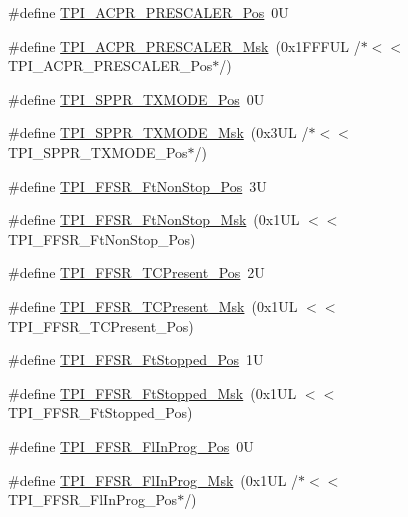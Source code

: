 \begin{DoxyCompactItemize}
\item 
\#define \hyperlink{group___c_m_s_i_s___t_p_i_ga5a82d274eb2df8b0c92dd4ed63535928}{T\+P\+I\+\_\+\+A\+C\+P\+R\+\_\+\+P\+R\+E\+S\+C\+A\+L\+E\+R\+\_\+\+Pos}~0U
\item 
\#define \hyperlink{group___c_m_s_i_s___t_p_i_ga4fcacd27208419929921aec8457a8c13}{T\+P\+I\+\_\+\+A\+C\+P\+R\+\_\+\+P\+R\+E\+S\+C\+A\+L\+E\+R\+\_\+\+Msk}~(0x1\+F\+F\+F\+U\+L /$\ast$$<$$<$ T\+P\+I\+\_\+\+A\+C\+P\+R\+\_\+\+P\+R\+E\+S\+C\+A\+L\+E\+R\+\_\+\+Pos$\ast$/)
\item 
\#define \hyperlink{group___c_m_s_i_s___t_p_i_ga0f302797b94bb2da24052082ab630858}{T\+P\+I\+\_\+\+S\+P\+P\+R\+\_\+\+T\+X\+M\+O\+D\+E\+\_\+\+Pos}~0U
\item 
\#define \hyperlink{group___c_m_s_i_s___t_p_i_gaca085c8a954393d70dbd7240bb02cc1f}{T\+P\+I\+\_\+\+S\+P\+P\+R\+\_\+\+T\+X\+M\+O\+D\+E\+\_\+\+Msk}~(0x3\+U\+L /$\ast$$<$$<$ T\+P\+I\+\_\+\+S\+P\+P\+R\+\_\+\+T\+X\+M\+O\+D\+E\+\_\+\+Pos$\ast$/)
\item 
\#define \hyperlink{group___c_m_s_i_s___t_p_i_ga9537b8a660cc8803f57cbbee320b2fc8}{T\+P\+I\+\_\+\+F\+F\+S\+R\+\_\+\+Ft\+Non\+Stop\+\_\+\+Pos}~3U
\item 
\#define \hyperlink{group___c_m_s_i_s___t_p_i_gaaa313f980974a8cfc7dac68c4d805ab1}{T\+P\+I\+\_\+\+F\+F\+S\+R\+\_\+\+Ft\+Non\+Stop\+\_\+\+Msk}~(0x1\+U\+L $<$$<$ T\+P\+I\+\_\+\+F\+F\+S\+R\+\_\+\+Ft\+Non\+Stop\+\_\+\+Pos)
\item 
\#define \hyperlink{group___c_m_s_i_s___t_p_i_gad30fde0c058da2ffb2b0a213be7a1b5c}{T\+P\+I\+\_\+\+F\+F\+S\+R\+\_\+\+T\+C\+Present\+\_\+\+Pos}~2U
\item 
\#define \hyperlink{group___c_m_s_i_s___t_p_i_ga0d6bfd263ff2fdec72d6ec9415fb1135}{T\+P\+I\+\_\+\+F\+F\+S\+R\+\_\+\+T\+C\+Present\+\_\+\+Msk}~(0x1\+U\+L $<$$<$ T\+P\+I\+\_\+\+F\+F\+S\+R\+\_\+\+T\+C\+Present\+\_\+\+Pos)
\item 
\#define \hyperlink{group___c_m_s_i_s___t_p_i_gaedf31fd453a878021b542b644e2869d2}{T\+P\+I\+\_\+\+F\+F\+S\+R\+\_\+\+Ft\+Stopped\+\_\+\+Pos}~1U
\item 
\#define \hyperlink{group___c_m_s_i_s___t_p_i_ga1ab6c3abe1cf6311ee07e7c479ce5f78}{T\+P\+I\+\_\+\+F\+F\+S\+R\+\_\+\+Ft\+Stopped\+\_\+\+Msk}~(0x1\+U\+L $<$$<$ T\+P\+I\+\_\+\+F\+F\+S\+R\+\_\+\+Ft\+Stopped\+\_\+\+Pos)
\item 
\#define \hyperlink{group___c_m_s_i_s___t_p_i_ga542ca74a081588273e6d5275ba5da6bf}{T\+P\+I\+\_\+\+F\+F\+S\+R\+\_\+\+Fl\+In\+Prog\+\_\+\+Pos}~0U
\item 
\#define \hyperlink{group___c_m_s_i_s___t_p_i_ga63dfb09259893958962914fc3a9e3824}{T\+P\+I\+\_\+\+F\+F\+S\+R\+\_\+\+Fl\+In\+Prog\+\_\+\+Msk}~(0x1\+U\+L /$\ast$$<$$<$ T\+P\+I\+\_\+\+F\+F\+S\+R\+\_\+\+Fl\+In\+Prog\+\_\+\+Pos$\ast$/)
$$
\end{DoxyCompactItemize}
